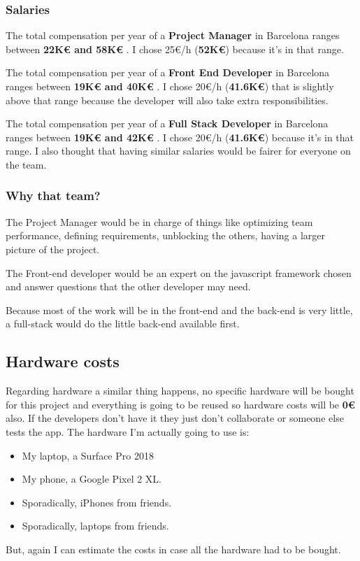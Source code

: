 \subsubsection{Salaries}

The total compensation per year of a \textbf{Project Manager} in Barcelona ranges between \textbf{22K€ and 58K€} \cite{project-manager-salary}. I chose 25€/h (\textbf{52K€}) because it's in that range.

The total compensation per year of a \textbf{Front End Developer} in Barcelona ranges between \textbf{19K€ and 40K€} \cite{front-end-salary}. I chose 20€/h (\textbf{41.6K€}) that is slightly above that range because the developer will also take extra responsibilities.

The total compensation per year of a \textbf{Full Stack Developer} in Barcelona ranges between \textbf{19K€ and 42K€} \cite{full-stack-salary}. I chose 20€/h (\textbf{41.6K€}) because it's in that range. I also thought that having similar salaries would be fairer for everyone on the team.

\subsubsection{Why that team?}

The Project Manager would be in charge of things like optimizing team performance, defining requirements, unblocking the others, having a larger picture of the project.

The Front-end developer would be an expert on the javascript framework chosen and answer questions that the other developer may need.

Because most of the work will be in the front-end and the back-end is very little, a full-stack would do the little back-end available first.

\newpage
\subsection{Hardware costs}
\label{sec:hardware}
Regarding hardware a similar thing happens, no specific hardware will be bought for this project and everything is going to be reused so hardware costs will be \textbf{0€} also. If the developers don't have it they just don't collaborate or someone else tests the app. The hardware I'm actually going to use is:
\begin{multicols}{2}
\begin{itemize}
    \item My laptop, a Surface Pro 2018
    \item My phone, a Google Pixel 2 XL.
    \item Sporadically, iPhones from friends.
    \item Sporadically, laptops from friends.
\end{itemize}
\end{multicols}
 But, again I can estimate the costs in case all the hardware had to be bought.


